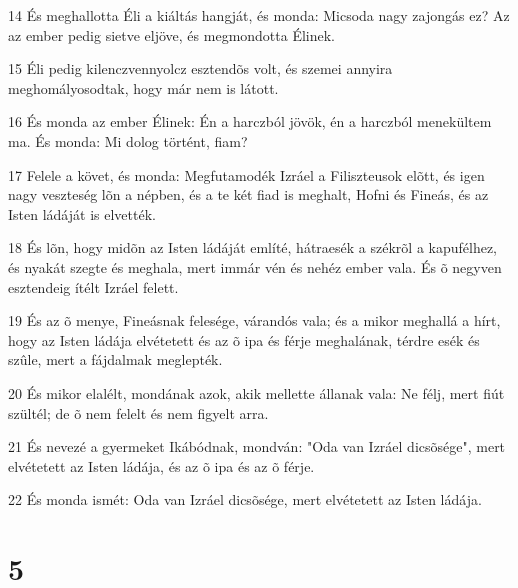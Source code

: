 \par 14 És meghallotta Éli a kiáltás hangját, és monda: Micsoda nagy zajongás ez? Az az ember pedig sietve eljöve, és megmondotta Élinek.
\par 15 Éli pedig kilenczvennyolcz esztendõs volt, és szemei annyira meghomályosodtak, hogy már nem is látott.
\par 16 És monda az ember Élinek: Én a harczból jövök, én a harczból menekültem ma. És monda: Mi dolog történt, fiam?
\par 17 Felele a követ, és monda: Megfutamodék Izráel a Filiszteusok elõtt, és igen nagy veszteség lõn a népben, és a te két fiad is meghalt, Hofni és Fineás, és az Isten ládáját is elvették.
\par 18 És lõn, hogy midõn az Isten ládáját említé, hátraesék a székrõl a kapufélhez, és nyakát szegte és meghala, mert immár vén és nehéz ember vala. És õ negyven esztendeig ítélt Izráel felett.
\par 19 És az õ menye, Fineásnak felesége, várandós vala; és a mikor meghallá a hírt, hogy az Isten ládája elvétetett és az õ ipa és férje meghalának, térdre esék és szûle, mert a fájdalmak meglepték.
\par 20 És mikor elalélt, mondának azok, akik mellette állanak vala: Ne félj, mert fiút szültél; de õ nem felelt és nem figyelt arra.
\par 21 És nevezé a gyermeket Ikábódnak, mondván: "Oda van Izráel dicsõsége", mert elvétetett az Isten ládája, és az õ ipa és az õ férje.
\par 22 És monda ismét: Oda van Izráel dicsõsége, mert elvétetett az Isten ládája.

\chapter{5}

